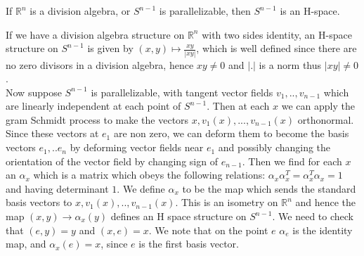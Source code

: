\documentclass[../Thesis.tex]{subfiles}
\begin{document}
\begin{lemma}
If $\mathbb{R}^n$ is a division algebra, or $S^{n-1}$ is parallelizable, then $S^{n-1}$ is an H-space.
\end{lemma}
\begin{myproof}
If we have a division algebra structure on $\mathbb{R}^n$ with two sides identity, an H-space structure on $S^{n-1}$ is given by $(x,y) \mapsto \frac{xy}{|xy|}$, which is well defined since there are no zero divisors in a division algebra, hence $xy \neq 0$ and $|.|$ is a norm thus $|xy| \neq 0$.
\\Now suppose $S^{n-1}$ is parallelizable, with tangent vector fields $v_1,..,v_{n-1}$ which are linearly independent at each point of $S^{n-1}$. Then at each $x$ we can apply the gram Schmidt process to make the vectors $x, v_1(x),...,v_{n-1}(x)$ orthonormal. Since these vectors at $e_1$ are non zero, we can deform them to become the basis vectors $e_1, .. e_n$ by deforming vector fields near $e_1$ and possibly changing the orientation of the vector field by changing sign of $e_{n-1}$. Then we find for each $x$ an $\alpha_x$ which is a matrix which obeys the following relations: $\alpha_x \alpha_x^T = \alpha_x^T\alpha_x = 1$ and having determinant $1$. We define $\alpha_x$ to be the map which sends the standard basis vectors to $x, v_1(x), ..,v_{n-1}(x)$. This is an isometry on $\mathbb{R}^n$ and hence the map $(x,y) \rightarrow \alpha_x(y)$ defines an H space structure on $S^{n-1}$. We need to check that $(e,y) = y$ and $(x,e) = x$. We note that on the point $e$ $\alpha_e$ is the identity map, and $\alpha_x(e) = x$, since $e$ is the first basis vector.
\end{myproof}
\end{document}
